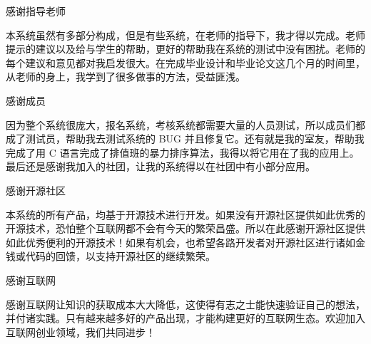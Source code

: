 \begin{ack}

感谢指导老师

本系统虽然有多部分构成，但是有些系统，在老师的指导下，我才得以完成。老师提示的建议以及给与学生的帮助，更好的帮助我在系统的测试中没有困扰。老师的每个建议和意见都对我启发很大。在完成毕业设计和毕业论文这几个月的时间里，从老师的身上，我学到了很多做事的方法，受益匪浅。

感谢成员

因为整个系统很庞大，报名系统，考核系统都需要大量的人员测试，所以成员们都成了测试员，帮助我去测试系统的 BUG 并且修复它。还有就是我的室友，帮助我完成了用 C 语言完成了排值班的暴力排序算法，我得以将它用在了我的应用上。最后还是感谢我加入的社团，让我的系统得以在社团中有小部分应用。

感谢开源社区

本系统的所有产品，均基于开源技术进行开发。如果没有开源社区提供如此优秀的开源技术，恐怕整个互联网都不会有今天的繁荣昌盛。所以在此感谢开源社区提供如此优秀便利的开源技术！如果有机会，也希望各路开发者对开源社区进行诸如金钱或代码的回馈，以支持开源社区的继续繁荣。

感谢互联网

感谢互联网让知识的获取成本大大降低，这使得有志之士能快速验证自己的想法，并付诸实践。只有越来越多好的产品出现，才能构建更好的互联网生态。欢迎加入互联网创业领域，我们共同进步！

\end{ack}
